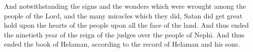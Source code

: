 \bverse \iffalse And notwithstanding the signs and the wonders which were wrought among the people of the Lord, and the many miracles which they did, Satan did get great hold upon the hearts of the people upon all the face of the land. \fi
And notwithstanding the signs and the wonders which were wrought among the people of the Lord, and the many miracles which they did, Satan did get great hold upon the hearts of the people upon all the face of the land.
\bverse \iffalse And thus ended the ninetieth year of the reign of the judges over the people of Nephi. \fi
And thus ended the ninetieth year of the reign of the judges over the people of Nephi.
\bverse \iffalse And thus ended the book of Helaman, according to the record of Helaman and his sons. \fi
And thus ended the book of Helaman, according to the record of Helaman and his sons.




